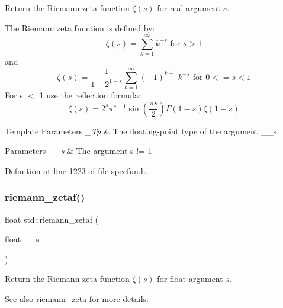 Return the Riemann zeta function $ \zeta(s) $ for real argument $ s $.

The Riemann zeta function is defined by\+: \[ \zeta(s) = \sum_{k=1}^{\infty} k^{-s} \mbox{ for } s > 1 \] and \[ \zeta(s) = \frac{1}{1-2^{1-s}}\sum_{k=1}^{\infty}(-1)^{k-1}k^{-s} \mbox{ for } 0 <= s < 1 \] For s $<$ 1 use the reflection formula\+: \[ \zeta(s) = 2^s \pi^{s-1} \sin(\frac{\pi s}{2}) \Gamma(1-s) \zeta(1-s) \]


\begin{DoxyTemplParams}{Template Parameters}
{\em \+\_\+\+Tp} & The floating-\/point type of the argument {\ttfamily \+\_\+\+\_\+s}. \\
\hline
\end{DoxyTemplParams}

\begin{DoxyParams}{Parameters}
{\em \+\_\+\+\_\+s} & The argument {\ttfamily  s != 1 } \\
\hline
\end{DoxyParams}


Definition at line 1223 of file specfun.\+h.

\mbox{\label{group__tr29124__math__spec__func_gaf92063315061a56d3e2c4053156d968e}} 
\subsubsection{\texorpdfstring{riemann\+\_\+zetaf()}{riemann\_zetaf()}}
{\footnotesize\ttfamily float std\+::riemann\+\_\+zetaf (\begin{DoxyParamCaption}\item[{float}]{\+\_\+\+\_\+s }\end{DoxyParamCaption})\hspace{0.3cm}{\ttfamily [inline]}}

Return the Riemann zeta function $ \zeta(s) $ for {\ttfamily float} argument $ s $.

\begin{DoxySeeAlso}{See also}
\hyperlink{group__tr29124__math__spec__func_ga57bb10396587a75e909d3c6e47dadf20}{riemann\+\_\+zeta} for more details. 
\end{DoxySeeAlso}


